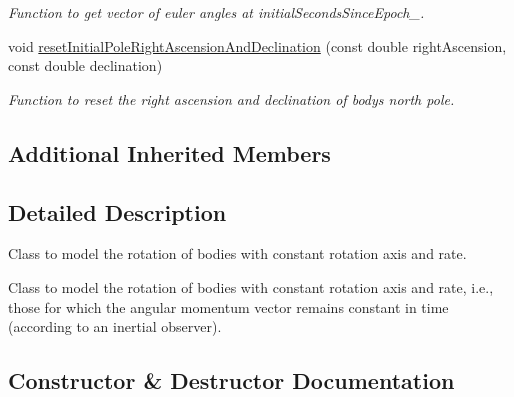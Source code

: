 \begin{DoxyCompactItemize}
\begin{DoxyCompactList}\small\item\em Function to get vector of euler angles at initial\+Seconds\+Since\+Epoch\+\_\+. \end{DoxyCompactList}\item 
void \hyperlink{classtudat_1_1ephemerides_1_1SimpleRotationalEphemeris_a11d6d95aa1ee76fcdbe4e10fe5584f7e}{reset\+Initial\+Pole\+Right\+Ascension\+And\+Declination} (const double right\+Ascension, const double declination)
\begin{DoxyCompactList}\small\item\em Function to reset the right ascension and declination of body\textquotesingle{}s north pole. \end{DoxyCompactList}\end{DoxyCompactItemize}
\subsection*{Additional Inherited Members}


\subsection{Detailed Description}
Class to model the rotation of bodies with constant rotation axis and rate. 

Class to model the rotation of bodies with constant rotation axis and rate, i.\+e., those for which the angular momentum vector remains constant in time (according to an inertial observer). 

\subsection{Constructor \& Destructor Documentation}
